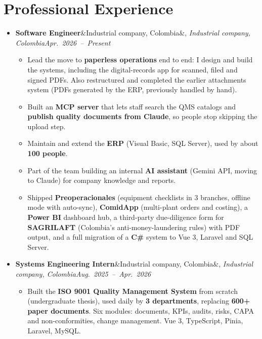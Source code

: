 \documentclass[a4paper,10pt]{article}
\newcommand{\entry}[3]{\textbf{#1}\ifx&#2&\else, \textit{#2}\fi \hfill \mbox{\textit{#3}}}
\begin{document}
\section*{Professional Experience}
\begin{itemize}
    \item \entry{Software Engineer}{Industrial company, Colombia}{Apr.\ 2026 -- Present}
        \begin{itemize}
            \item Lead the move to \textbf{paperless operations} end to end: I design and build
                the systems, including the digital-records app for scanned, filed and signed
                PDFs. Also restructured and completed the earlier attachments system (PDFs
                generated by the ERP, previously handled by hand).
            \item Built an \textbf{MCP server} that lets staff search the QMS catalogs and
                \textbf{publish quality documents from Claude}, so people stop skipping the
                upload step.
            \item Maintain and extend the \textbf{ERP} (Visual Basic, SQL Server), used by about
                \textbf{100 people}.
            \item Part of the team building an internal \textbf{AI assistant} (Gemini API, moving
                to Claude) for company knowledge and reports.
            \item Shipped \textbf{Preoperacionales} (equipment checklists in 3 branches, offline
                mode with auto-sync), \textbf{ComidApp} (multi-plant orders and costing), a
                \textbf{Power BI} dashboard hub, a third-party due-diligence form for
                \textbf{SAGRILAFT} (Colombia's anti-money-laundering rules) with PDF output, and
                a full migration of a \textbf{C\#} system to Vue 3,
                Laravel and SQL Server.
        \end{itemize}

    \item \entry{Systems Engineering Intern}{Industrial company, Colombia}{Aug.\ 2025 -- Apr.\ 2026}
        \begin{itemize}
            \item Built the \textbf{ISO 9001 Quality Management System} from scratch
                (undergraduate thesis), used daily by \textbf{3 departments}, replacing
                \textbf{600+ paper documents}. Six modules: documents, KPIs, audits, risks,
                CAPA and non-conformities, change management. Vue 3, TypeScript, Pinia,
                Laravel, MySQL.
        \end{itemize}


\end{itemize}
\end{document}
